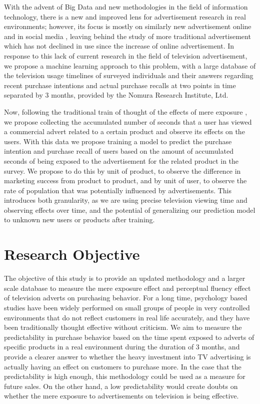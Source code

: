 \documentclass[review]{elsarticle}
\begin{document}
With the advent of Big Data and new methodologies in the field of information technology, there is a new and improved lens for advertisement research in real environments; however, its focus is mostly on similarly new advertisement online and in social media \cite{6,7,8,9}, leaving behind the study of more traditional advertisement which has not declined in use since the increase of online advertisement. In response to this lack of current research in the field of television advertisement, we propose a machine learning approach to this problem, with a large database of the television usage timelines of surveyed individuals and their answers regarding recent purchase intentions and actual purchase recalls at two points in time separated by 3 months, provided by the Nomura Research Institute, Ltd. 

Now, following the traditional train of thought of the effects of mere exposure \cite{10}, we propose collecting the accumulated number of seconds that a user has viewed a commercial advert related to a certain product and observe its effects on the users. With this data we propose training a model to predict the purchase intention and purchase recall of users based on the amount of accumulated seconds of being exposed to the advertisement for the related product in the survey. We propose to do this by unit of product, to observe the difference in marketing success from product to product, and by unit of user, to observe the rate of population that was potentially influenced by advertisements. This introduces both granularity, as we are using precise television viewing time and observing effects over time, and the potential of generalizing our prediction model to unknown new users or products after training.

\section{Research Objective}
\label{resobj}

The objective of this study is to provide an updated methodology and a larger scale database to measure the mere exposure effect and perceptual fluency effect of television adverts on purchasing behavior. For a long time, psychology based studies have been widely performed on small groups of people in very controlled environments that do not reflect customers in real life accurately, and they have been traditionally thought effective without criticism. We aim to measure the predictability in purchase behavior based on the time spent exposed to adverts of specific products in a real environment during the duration of 3 months, and provide a clearer answer to whether the heavy investment into TV advertising is actually having an effect on customers to purchase more. In the case that the predictability is high enough, this methodology could be used as a measure for future sales. On the other hand, a low predictability would create doubts on whether the mere exposure to advertisements on television is being effective.
\end{document}
